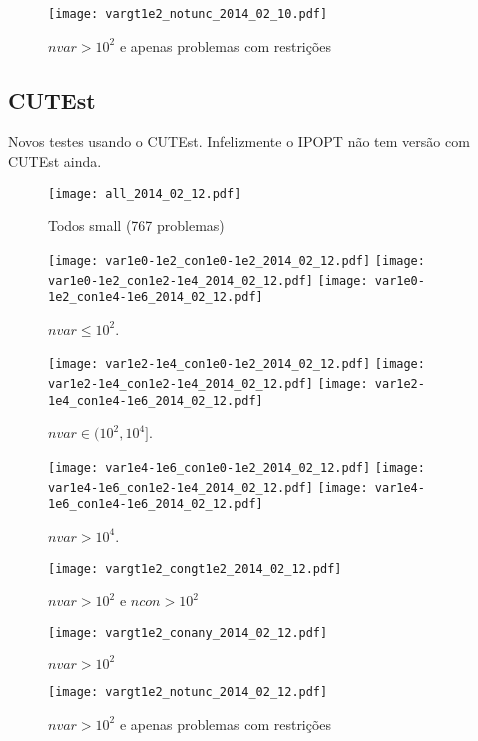 \documentclass{article}
\begin{document}
\begin{figure}[H]
\centering
\texttt{[image: vargt1e2\_notunc\_2014\_02\_10.pdf]}
\caption{ $nvar > 10^2$ e apenas problemas com restrições }
\label{fig:nvar_medium_and_big_not_unc}
\end{figure}

\subsection {CUTEst}

Novos testes usando o CUTEst. Infelizmente o IPOPT não tem versão com CUTEst
ainda.

\begin{figure}[H]
  \centering
  \texttt{[image: all\_2014\_02\_12.pdf]}
  \caption{ Todos small (767 problemas) }
\end{figure}

\begin{figure}[H]
\centering
\texttt{[image: var1e0-1e2\_con1e0-1e2\_2014\_02\_12.pdf]}
\texttt{[image: var1e0-1e2\_con1e2-1e4\_2014\_02\_12.pdf]}
\texttt{[image: var1e0-1e2\_con1e4-1e6\_2014\_02\_12.pdf]}
\caption{ $nvar \leq 10^2$. }
\end{figure}
\begin{figure}[H]
\centering
\texttt{[image: var1e2-1e4\_con1e0-1e2\_2014\_02\_12.pdf]}
\texttt{[image: var1e2-1e4\_con1e2-1e4\_2014\_02\_12.pdf]}
\texttt{[image: var1e2-1e4\_con1e4-1e6\_2014\_02\_12.pdf]}
\caption{ $nvar \in (10^2,10^4]$. }
\end{figure}
\begin{figure}[H]
\centering
\texttt{[image: var1e4-1e6\_con1e0-1e2\_2014\_02\_12.pdf]}
\texttt{[image: var1e4-1e6\_con1e2-1e4\_2014\_02\_12.pdf]}
\texttt{[image: var1e4-1e6\_con1e4-1e6\_2014\_02\_12.pdf]}
\caption{ $nvar > 10^4$. }
\end{figure}

\begin{figure}[H]
\centering
\texttt{[image: vargt1e2\_congt1e2\_2014\_02\_12.pdf]}
\caption{ $nvar > 10^2$ e $ncon > 10^2$ }
\end{figure}

\begin{figure}[!ht]
\centering
\texttt{[image: vargt1e2\_conany\_2014\_02\_12.pdf]}
\caption{ $nvar > 10^2$ }
\end{figure}

\begin{figure}[!ht]
\centering
\texttt{[image: vargt1e2\_notunc\_2014\_02\_12.pdf]}
\caption{ $nvar > 10^2$ e apenas problemas com restrições }
\end{figure}
\end{document}
